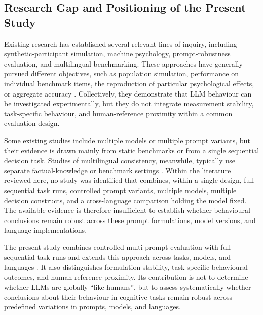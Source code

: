 \subsection{Research Gap and Positioning of the Present Study}

Existing research has established several relevant lines of inquiry, including synthetic-participant simulation, machine psychology, prompt-robustness evaluation, and multilingual benchmarking. These approaches have generally pursued different objectives, such as population simulation, performance on individual benchmark items, the reproduction of particular psychological effects, or aggregate accuracy \cite{Dillion2023ReplaceParticipants,Hagendorff2023MachinePsychology,Mizrahi2024MultiPrompt,Zhang2023M3Exam}. Collectively, they demonstrate that LLM behaviour can be investigated experimentally, but they do not integrate measurement stability, task-specific behaviour, and human-reference proximity within a common evaluation design.

Some existing studies include multiple models or multiple prompt variants, but their evidence is drawn mainly from static benchmarks or from a single sequential decision task. Studies of multilingual consistency, meanwhile, typically use separate factual-knowledge or benchmark settings \cite{Loya2023PromptSensitivityDecision,Sclar2024PromptFormatting,Qi2023CrossLingualConsistency}. Within the literature reviewed here, no study was identified that combines, within a single design, full sequential task runs, controlled prompt variants, multiple models, multiple decision constructs, and a cross-language comparison holding the model fixed. The available evidence is therefore insufficient to establish whether behavioural conclusions remain robust across these prompt formulations, model versions, and language implementations.

The present study combines controlled multi-prompt evaluation with full sequential task runs and extends this approach across tasks, models, and languages \cite{Loya2023PromptSensitivityDecision,Sclar2024PromptFormatting,Mizrahi2024MultiPrompt}. It also distinguishes formulation stability, task-specific behavioural outcomes, and human-reference proximity. Its contribution is not to determine whether LLMs are globally ``like humans'', but to assess systematically whether conclusions about their behaviour in cognitive tasks remain robust across predefined variations in prompts, models, and languages.
